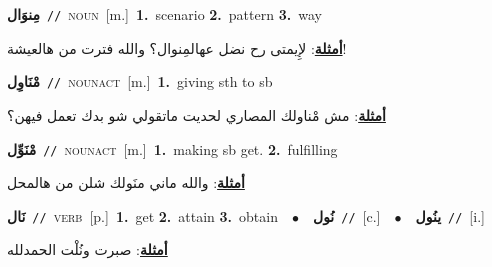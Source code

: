 \documentclass[10pt,a4paper,twoside]{article} %
\begin{document}
\begin{multicols}{2}
{\setlength\topsep{0pt}\textbf{\foreignlanguage{arabic}{مِنوَال}}\ {\color{gray}\texttt{//}\color{black}}\ \textsc{noun}\ [m.]\ \textbf{1.}~scenario  \textbf{2.}~pattern  \textbf{3.}~way\  \begin{flushright}\color{gray}\foreignlanguage{arabic}{\textbf{\underline{\foreignlanguage{arabic}{أمثلة}}}: لإِيمتى رح نضل عهالمِنوال؟ والله فترت من هالعيشة!}\end{flushright}\color{black}} \vspace{2mm}

{\setlength\topsep{0pt}\textbf{\foreignlanguage{arabic}{مْنَاوِل}}\ {\color{gray}\texttt{//}\color{black}}\ \textsc{noun\textunderscore act}\ [m.]\ \textbf{1.}~giving sth to sb\  \begin{flushright}\color{gray}\foreignlanguage{arabic}{\textbf{\underline{\foreignlanguage{arabic}{أمثلة}}}: مش مْناولك المصاري لحديت ماتقولي شو بدك تعمل فيهن؟}\end{flushright}\color{black}} \vspace{2mm}

{\setlength\topsep{0pt}\textbf{\foreignlanguage{arabic}{مْنَوِّل}}\ {\color{gray}\texttt{//}\color{black}}\ \textsc{noun\textunderscore act}\ [m.]\ \textbf{1.}~making sb get.  \textbf{2.}~fulfilling\  \begin{flushright}\color{gray}\foreignlanguage{arabic}{\textbf{\underline{\foreignlanguage{arabic}{أمثلة}}}: والله ماني منَولك شلن من هالمحل}\end{flushright}\color{black}} \vspace{2mm}

{\setlength\topsep{0pt}\textbf{\foreignlanguage{arabic}{نَال}}\ {\color{gray}\texttt{//}\color{black}}\ \textsc{verb}\ [p.]\ \textbf{1.}~get  \textbf{2.}~attain  \textbf{3.}~obtain\ \ $\bullet$\ \ \setlength\topsep{0pt}\textbf{\foreignlanguage{arabic}{نُول}}\ {\color{gray}\texttt{//}\color{black}}\ [c.]\ \ $\bullet$\ \ \setlength\topsep{0pt}\textbf{\foreignlanguage{arabic}{ينُول}}\ {\color{gray}\texttt{//}\color{black}}\ [i.]\  \begin{flushright}\color{gray}\foreignlanguage{arabic}{\textbf{\underline{\foreignlanguage{arabic}{أمثلة}}}: صبرت ونُلْت الحمدلله}\end{flushright}\color{black}} \vspace{2mm}


\end{multicols}
\end{document}
